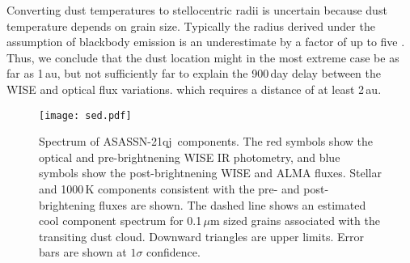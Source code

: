\documentclass[sn-nature]{sn-jnl}%
\newcommand{\asas}{ASASSN-21qj}
\begin{document}
Converting dust temperatures to stellocentric radii is uncertain because dust temperature depends on grain size.
%
Typically the radius derived under the assumption of blackbody emission is an underestimate by a factor of up to five \citep{2013MNRAS.428.1263B,2015MNRAS.454.3207P}.
%
Thus, we conclude that the dust location might in the most extreme case be as far as 1\,au, but not sufficiently far to explain the 900\,day delay between the WISE and optical flux variations. which requires a distance of at least 2\,au.


\begin{figure}
    \centering
    \texttt{[image: sed.pdf]}
    \caption{Spectrum of \asas{}~components. The red symbols show the optical and pre-brightnening WISE IR photometry, and blue symbols show the post-brightnening WISE and ALMA fluxes. Stellar and 1000\,K components consistent with the pre- and post-brightening fluxes are shown. The dashed line shows an estimated cool component spectrum for 0.1\,$\mu$m sized grains associated with the transiting dust cloud. Downward triangles are upper limits.
    Error bars are shown at $1\sigma$ confidence.
}
    \label{fig:sed}
\end{figure}
%
\end{document}
